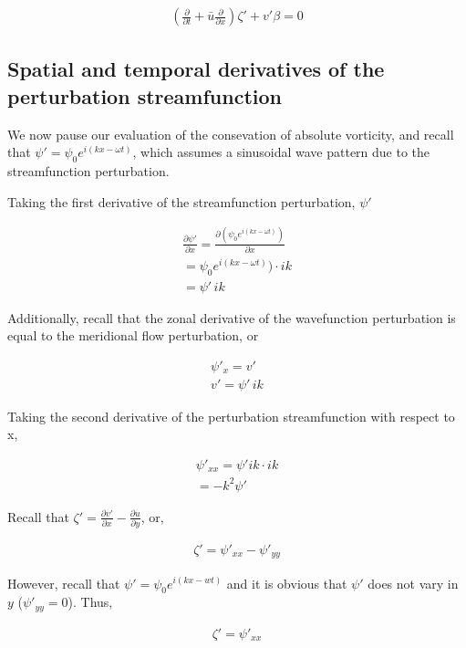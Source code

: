 \documentclass[a4paper,12pt]{article}
\begin{document}
\begin{align}
(\frac{\partial}{\partial t} + \bar{u}\frac{\partial}{\partial x})\zeta\prime + v\prime \beta = 0
\end{align}

\subsection*{Spatial and temporal derivatives of the perturbation streamfunction}

We now pause our evaluation of the consevation of absolute vorticity, and recall that $\psi\prime = \psi_0 e^{i(kx-\omega t)}$, which assumes a sinusoidal wave pattern due to the streamfunction perturbation.

Taking the first derivative of the streamfunction perturbation, $\psi\prime$

\begin{align}
\frac{\partial \psi\prime}{\partial x} = \frac{\partial(\psi_0 e^{i(kx-\omega t)})}{\partial x}\\
= \psi_0 e^{i(kx-\omega t)}) \cdot ik\\
= \psi\prime \, ik
\end{align}

Additionally, recall that the zonal derivative of the wavefunction perturbation is equal to the meridional flow perturbation, or

\begin{align}
\psi \prime_x = v\prime\\
v\prime = \psi\prime \, ik
\end{align}

Taking the second derivative of the perturbation streamfunction with respect to x,

\begin{align}
\psi\prime_{xx} = \psi\prime ik \cdot ik\\
= -k^2\psi\prime
\end{align}

Recall that $\zeta\prime = \frac{\partial v\prime}{\partial x} - \frac{\partial u}{\partial y}$, or,

\begin{align}
\zeta\prime = \psi\prime_{xx} - \psi\prime_{yy}
\end{align}

However, recall that $\psi\prime = \psi_0 e^{i(kx - wt)}$ and it is obvious that $\psi\prime$ does not vary in $y$ ($\psi\prime_{yy} = 0$). Thus,

\begin{align}
\zeta\prime = \psi\prime_{xx}
\end{align}
\end{document}
